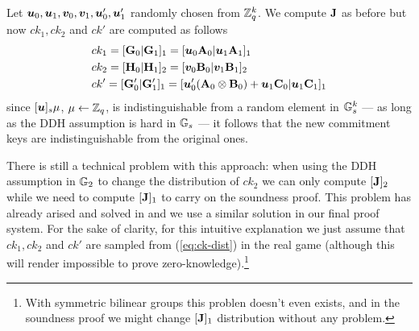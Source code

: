 Let ${\boldsymbol{u}}_0,{\boldsymbol{u}}_1,{\boldsymbol{v}}_0,{\boldsymbol{v}}_1,{\boldsymbol{u}}'_0,{\boldsymbol{u}}'_1$ randomly chosen from $\mathbb{Z}_q^k$. We compute $\mathbf{{J}}$ as before but now $ck_1,ck_2$ and $ck'$ are computed as follows
\begin{align}
&ck_1 = [\mathbf{{G}}_0|\mathbf{{G}}_1]_1 = [{\boldsymbol{u}}_0\mathbf{{A}}_{0}|{\boldsymbol{u}}_1\mathbf{{A}}_1]_1 \nonumber \\
&ck_2 = [\mathbf{{H}}_0|\mathbf{{H}}_1]_2 = [{\boldsymbol{v}}_0\mathbf{{B}}_{0}|{\boldsymbol{v}}_1\mathbf{{B}}_1]_2 \nonumber \\
&ck' =  [\mathbf{{G}}'_0|\mathbf{{G}}'_1]_1 = [{\boldsymbol{u}}'_0(\mathbf{{A}}_0\otimes\mathbf{{B}}_0) + {\boldsymbol{u}}_1\mathbf{{C}}_0|{\boldsymbol{u}}_1\mathbf{{C}}_1]_1 \label{eq:ck-dist}
\end{align}
since $[{\boldsymbol{u}}]_s\mu$, $\mu\gets \mathbb{Z}_q$, is indistinguishable from a random element in $\mathbb{G}_s^k$ --- as long as the DDH assumption is hard in $\mathbb{G}_s$ --- it follows that the new commitment keys are indistinguishable from the original ones.

There is still a technical problem with this approach: when using the DDH assumption in $\mathbb{G}_2$ to change the distribution of $ck_2$ we can only compute $[\mathbf{{J}}]_2$ while we need to compute $[\mathbf{{J}}]_1$ to carry on the soundness proof. This problem has already arised and solved in \cite{AC:GonHevRaf15} and we use a similar solution in our final proof system. For the sake of clarity, for this intuitive explanation we just assume that $ck_1,ck_2$ and $ck'$ are sampled from (\ref{eq:ck-dist}) in the real game (although this will render impossible to prove zero-knowledge).\footnote{With symmetric bilinear groups this problen doesn't even exists, and in the soundness proof we might change $[\mathbf{{J}}]_1$ distribution without any problem.}

